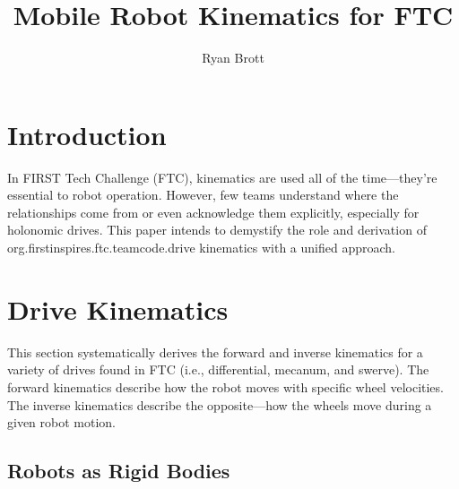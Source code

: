 \documentclass{article}
\title{Mobile Robot Kinematics for FTC}
\author{Ryan Brott}
\date{}
\begin{document}
\maketitle

\section{Introduction}

In FIRST Tech Challenge (FTC), kinematics are used all of the time---they're essential to robot operation. However, few teams  understand where the relationships come from or even acknowledge them explicitly, especially for holonomic drives. This paper intends to demystify the role and derivation of org.firstinspires.ftc.teamcode.drive kinematics with a unified approach.

\section{Drive Kinematics}

This section systematically derives the forward and inverse kinematics for a variety of drives found in FTC (i.e., differential, mecanum, and swerve). The forward kinematics describe how the robot moves with specific wheel velocities. The inverse kinematics describe the opposite---how the wheels move during a given robot motion. 

\subsection{Robots as Rigid Bodies}
\end{document}
